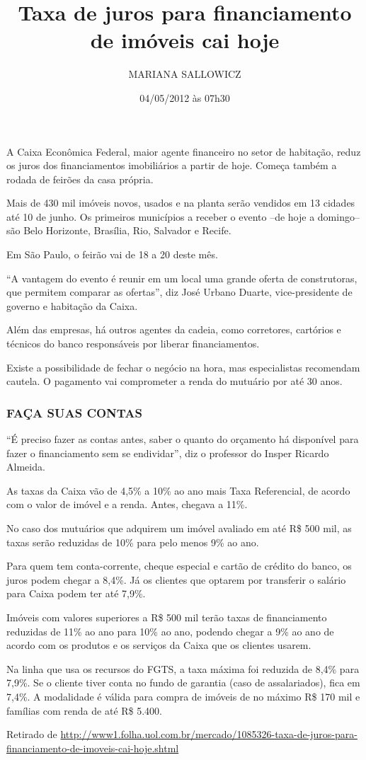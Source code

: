 \documentclass[12pt, a4paper]{article}
\title{Taxa de juros para financiamento de imóveis cai hoje}
\author{MARIANA SALLOWICZ}
\date{04/05/2012 às 07h30}
\begin{document}
\maketitle

A Caixa Econômica Federal, maior agente financeiro no setor de habitação, reduz os juros dos financiamentos imobiliários a partir de hoje. Começa também a rodada de feirões da casa própria.

Mais de 430 mil imóveis novos, usados e na planta serão vendidos em 13 cidades até 10 de junho. Os primeiros municípios a receber o evento --de hoje a domingo-- são Belo Horizonte, Brasília, Rio, Salvador e Recife.

Em São Paulo, o feirão vai de 18 a 20 deste mês.

``A vantagem do evento é reunir em um local uma grande oferta de construtoras, que permitem comparar as ofertas'', diz José Urbano Duarte, vice-presidente de governo e habitação da Caixa.

Além das empresas, há outros agentes da cadeia, como corretores, cartórios e técnicos do banco responsáveis por liberar financiamentos.

Existe a possibilidade de fechar o negócio na hora, mas especialistas recomendam cautela. O pagamento vai comprometer a renda do mutuário por até 30 anos.

\subsubsection*{FAÇA SUAS CONTAS}

``É preciso fazer as contas antes, saber o quanto do orçamento há disponível para fazer o financiamento sem se endividar'', diz o professor do Insper Ricardo Almeida.

As taxas da Caixa vão de 4,5\% a 10\% ao ano mais Taxa Referencial, de acordo com o valor de imóvel e a renda. Antes, chegava a 11\%.

No caso dos mutuários que adquirem um imóvel avaliado em até R\$ 500 mil, as taxas serão reduzidas de 10\% para pelo menos 9\% ao ano.

Para quem tem conta-corrente, cheque especial e cartão de crédito do banco, os juros podem chegar a 8,4\%. Já os clientes que optarem por transferir o salário para Caixa podem ter até 7,9\%.

Imóveis com valores superiores a R\$ 500 mil terão taxas de financiamento reduzidas de 11\% ao ano para 10\% ao ano, podendo chegar a 9\% ao ano de acordo com os produtos e os serviços da Caixa que os clientes usarem.

Na linha que usa os recursos do FGTS, a taxa máxima foi reduzida de 8,4\% para 7,9\%. Se o cliente tiver conta no fundo de garantia (caso de assalariados), fica em 7,4\%. A modalidade é válida para compra de imóveis de no máximo R\$ 170 mil e famílias com renda de até R\$ 5.400.
	

\begin{flushright}
Retirado de \url{http://www1.folha.uol.com.br/mercado/1085326-taxa-de-juros-para-financiamento-de-imoveis-cai-hoje.shtml}
\end{flushright}
\end{document}
